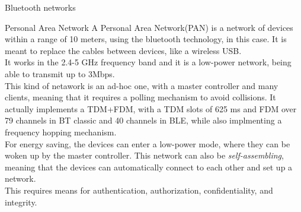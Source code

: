 \begin{section}{Bluetooth networks}
  \begin{subsection}{Personal Area Network}
    A Personal Area Network(PAN) is a network of devices within a range of 10 meters, using the bluetooth
    technology, in this case. It is meant to replace the cables between devices, like a wireless USB.\\
    It works in the 2.4-5 GHz frequency band and it is a low-power network, being able to transmit
    up to 3Mbps.\\
    This kind of netawork is an ad-hoc one, with a master controller and many clients, meaning that 
    it requires a polling mechanism to avoid collisions. It actually implements a TDM+FDM, with a 
    TDM slots of 625 ms and FDM over 79 channels in BT classic and 40 channels in BLE, while also 
    implmenting a frequency hopping mechanism.\\
    For energy saving, the devices can enter a low-power mode, where they can be woken up by the master
    controller. This network can also be \textit{self-assembling}, meaning that the devices can
    automatically connect to each other and set up a network.\\
    This requires means for authentication, authorization, confidentiality, and integrity.\\
  \end{subsection}
\end{section}

